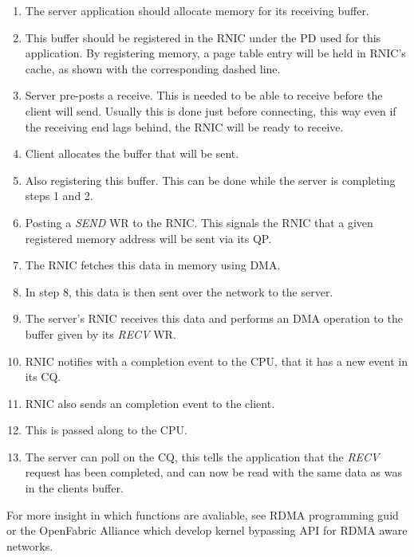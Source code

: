 \begin{enumerate}
    \item The server application should allocate memory for its receiving buffer.
    \item This buffer should be registered in the RNIC under the PD used for this application.
    By registering memory, a page table entry will be held in RNIC's cache, as shown with the corresponding dashed line.
    \item Server pre-posts a receive.
    This is needed to be able to receive before the client will send.
    Usually this is done just before connecting, this way even if the receiving end lags behind, the RNIC will be ready to receive.
    \item Client allocates the buffer that will be sent.
    \item Also registering this buffer.
    This can be done while the server is completing steps 1 and 2.
    \item Posting a \textit{SEND} WR to the RNIC.
    This signals the RNIC that a given registered memory address will be sent via its QP.
    \item The RNIC fetches this data in memory using DMA.
    \item In step 8, this data is then sent over the network to the server.
    \item The server's RNIC receives this data and performs an DMA operation to the buffer given by its \textit{RECV} WR.
    \item RNIC notifies with a completion event to the CPU, that it has a new event in its CQ.
    \item RNIC also sends an completion event to the client.
    \item This is passed along to the CPU.
    \item The server can poll on the CQ, this tells the application that the \textit{RECV} request has been completed, and can now be read with the same data as was in the clients buffer.
\end{enumerate}

For more insight in which functions are avaliable, see RDMA programming guid \cite{mellanox_prog_guide} or the OpenFabric Alliance\cite{openfab} which develop kernel bypassing API for RDMA aware networks.
